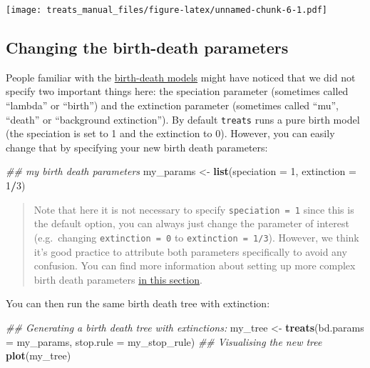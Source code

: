 \documentclass[
]{book}
\newenvironment{Shaded}{\begin{snugshade}}{\end{snugshade}}
\newcommand{\CommentTok}[1]{\textcolor[rgb]{0.56,0.35,0.01}{\textit{#1}}}
\newcommand{\DataTypeTok}[1]{\textcolor[rgb]{0.13,0.29,0.53}{#1}}
\newcommand{\DecValTok}[1]{\textcolor[rgb]{0.00,0.00,0.81}{#1}}
\newcommand{\KeywordTok}[1]{\textcolor[rgb]{0.13,0.29,0.53}{\textbf{#1}}}
\newcommand{\NormalTok}[1]{#1}
\newcommand{\OperatorTok}[1]{\textcolor[rgb]{0.81,0.36,0.00}{\textbf{#1}}}
\newcommand{\StringTok}[1]{\textcolor[rgb]{0.31,0.60,0.02}{#1}}
\begin{document}
\texttt{[image: treats\_manual\_files/figure-latex/unnamed-chunk-6-1.pdf]}

\hypertarget{changing-the-birth-death-parameters}{%
\subsection{Changing the birth-death parameters}\label{changing-the-birth-death-parameters}}

People familiar with the \href{https://lukejharmon.github.io/pcm/chapter10_birthdeath/}{birth-death models} might have noticed that we did not specify two important things here: the speciation parameter (sometimes called ``lambda'' or ``birth'') and the extinction parameter (sometimes called ``mu'', ``death'' or ``background extinction'').
By default \texttt{treats} runs a pure birth model (the speciation is set to 1 and the extinction to 0).
However, you can easily change that by specifying your new birth death parameters:

\begin{Shaded}
\begin{Highlighting}[]
\CommentTok{\#\# my birth death parameters}
\NormalTok{my\_params \textless{}{-}}\StringTok{ }\KeywordTok{list}\NormalTok{(}\DataTypeTok{speciation =} \DecValTok{1}\NormalTok{,}
                  \DataTypeTok{extinction =} \DecValTok{1}\OperatorTok{/}\DecValTok{3}\NormalTok{)}
\end{Highlighting}
\end{Shaded}

\begin{quote}
Note that here it is not necessary to specify \texttt{speciation\ =\ 1} since this is the default option, you can always just change the parameter of interest (e.g.~changing \texttt{extinction\ =\ 0} to \texttt{extinction\ =\ 1/3}). However, we think it's good practice to attribute both parameters specifically to avoid any confusion.
You can find more information about setting up more complex birth death parameters \protect\hyperlink{makebdparams}{in this section}.
\end{quote}

You can then run the same birth death tree with extinction:

\begin{Shaded}
\begin{Highlighting}[]
\CommentTok{\#\# Generating a birth death tree with extinctions:}
\NormalTok{my\_tree \textless{}{-}}\StringTok{ }\KeywordTok{treats}\NormalTok{(}\DataTypeTok{bd.params =}\NormalTok{ my\_params, }\DataTypeTok{stop.rule =}\NormalTok{ my\_stop\_rule)}
\CommentTok{\#\# Visualising the new tree}
\KeywordTok{plot}\NormalTok{(my\_tree)}
\end{Highlighting}
\end{Shaded}
\end{document}
